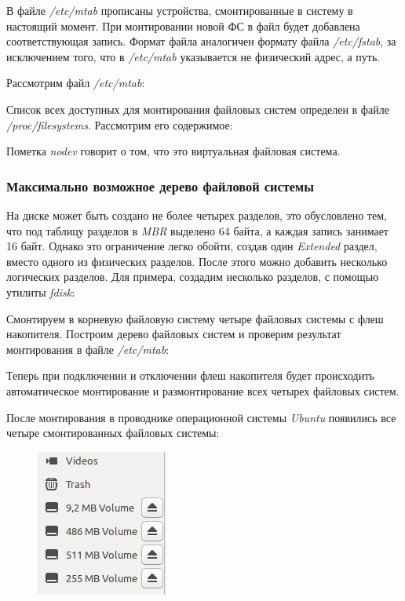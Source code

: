 \documentclass[14pt,a4paper,report]{report}
\begin{document}
В файле \emph{/etc/mtab} прописаны устройства, смонтированные в систему в настоящий момент. При монтировании новой ФС в файл будет добавлена соответствующая запись. Формат файла аналогичен формату файла \emph{/etc/fstab}, за исключением того, что в \emph{/etc/mtab} указывается не физический адрес, а путь.

Рассмотрим файл \emph{/etc/mtab}:



Список всех доступных для монтирования файловых систем определен в файле \emph{/proc/filesystems}. Рассмотрим его содержимое:



Пометка \emph{nodev} говорит о том, что это виртуальная файловая система.

\subsubsection{Максимально возможное дерево файловой системы}

На диске может быть создано не более четырех разделов, это обусловлено тем, что под таблицу разделов в \emph{MBR} выделено 64 байта, а каждая запись занимает 16 байт. Однако это ограничение легко обойти, создав один \emph{Extended} раздел, вместо одного из физических разделов. После этого можно добавить несколько логических разделов. Для примера, создадим несколько разделов, с помощью утилиты \emph{fdisk}:



Смонтируем в корневую файловую систему четыре файловых системы с флеш накопителя. Построим дерево файловых систем и проверим результат монтирования в файле \emph{/etc/mtab}:



Теперь при подключении и отключении флеш накопителя будет происходить автоматическое монтирование и размонтирование всех четырех файловых систем.

После монтирования в проводнике операционной системы \emph{Ubuntu} появились все четыре смонтированных файловых системы:

\begin{figure}[h!]
	\centering
	\includegraphics[scale = 0.85]{images/11.png}
	
	\caption{}
	\label{image:1}
\end{figure}
\end{document}
